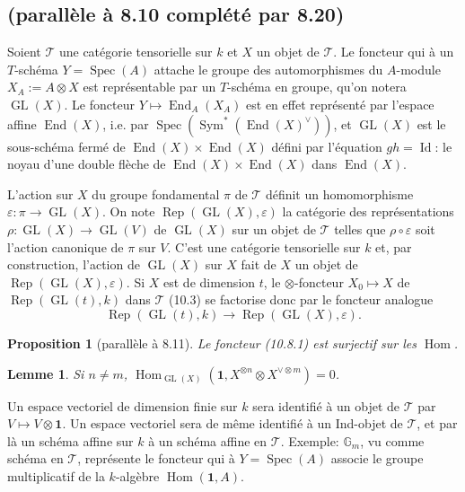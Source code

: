 \documentclass[11pt,a4paper]{article}
\theoremstyle{plain}
\newtheorem{lemma}[theorem]{Lemme}
\newtheorem{proposition}[theorem]{Proposition}
\theoremstyle{definition}
\DeclareMathOperator{\Hom}{Hom}
\DeclareMathOperator{\Spec}{Spec}
\DeclareMathOperator{\End}{End}
\DeclareMathOperator{\Sym}{Sym}
\DeclareMathOperator{\Rep}{Rep}
\DeclareMathOperator{\GL}{GL}
\newcommand{\eps}{\varepsilon}
\DeclareMathOperator{\Id}{Id}
\begin{document}
\subsection{(parall\`ele \`a 8.10 compl\'et\'e par 8.20)}
Soient $\mathcal{T}$ une cat\'egorie tensorielle sur $k$ et $X$ un objet de $\mathcal{T}$. Le foncteur qui \`a un $T$-sch\'ema $Y = \Spec(A)$ attache le groupe des automorphismes du $A$-module $X_A := A \otimes X$ est repr\'esentable par un $T$-sch\'ema en groupe, qu'on notera $\GL(X)$. Le foncteur $Y \mapsto \End_A(X_A)$ est en effet repr\'esent\'e par l'espace affine $\End(X)$, i.e. par $\Spec(\Sym^*(\End(X)^\vee))$, et $\GL(X)$ est le sous-sch\'ema ferm\'e de $\End(X) \times \End(X)$ d\'efini par l'\'equation $gh = \Id$: le noyau d'une double fl\`eche de $\End(X) \times \End(X)$ dans $\End(X)$.

L'action sur $X$ du groupe fondamental $\pi$ de $\mathcal{T}$ d\'efinit un homomorphisme $\eps : \pi \to \GL(X)$. On note $\Rep(\GL(X), \eps)$ la cat\'egorie des repr\'esentations $\rho : \GL(X) \to \GL(V)$ de $\GL(X)$ sur un objet de $\mathcal{T}$ telles que $\rho \circ \eps$ soit l'action canonique de $\pi$ sur $V$. C'est une cat\'egorie tensorielle sur $k$ et, par construction, l'action de $\GL(X)$ sur $X$ fait de $X$ un objet de $\Rep(\GL(X), \eps)$. Si $X$ est de dimension $t$, le $\otimes$-foncteur $X_0 \mapsto X$ de $\Rep(\GL(t), k)$ dans $\mathcal{T}$ (10.3) se factorise donc par le foncteur analogue
\begin{equation}
\Rep(\GL(t), k) \to \Rep(\GL(X), \eps). \tag{10.8.1}
\end{equation}

\begin{proposition}[parall\`ele \`a 8.11]
Le foncteur (10.8.1) est surjectif sur les $\Hom$.
\end{proposition}

\begin{lemma}
Si $n \neq m$, $\Hom_{\GL(X)}(\mathbf{1}, X^{\otimes n} \otimes X^{\vee \otimes m}) = 0$.
\end{lemma}

Un espace vectoriel de dimension finie sur $k$ sera identifi\'e \`a un objet de $\mathcal{T}$ par $V \mapsto V \otimes \mathbf{1}$. Un espace vectoriel sera de m\^eme identifi\'e \`a un Ind-objet de $\mathcal{T}$, et par l\`a un sch\'ema affine sur $k$ \`a un sch\'ema affine en $\mathcal{T}$. Exemple: $\mathbb{G}_m$, vu comme sch\'ema en $\mathcal{T}$, repr\'esente le foncteur qui \`a $Y = \Spec(A)$ associe le groupe multiplicatif de la $k$-alg\`ebre $\Hom(\mathbf{1}, A)$.
\end{document}
